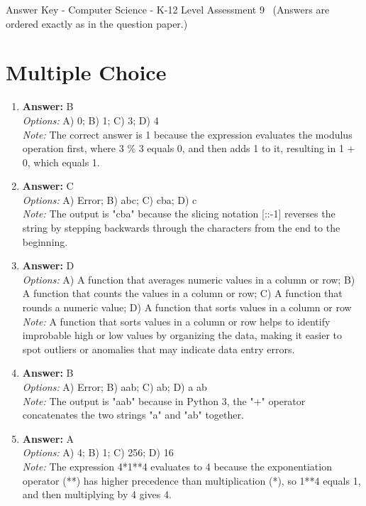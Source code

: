 \documentclass[12pt]{article}
\begin{document}
\begin{center}
Answer Key - Computer Science - K-12 Level Assessment 9 \
\small (Answers are ordered exactly as in the question paper.)
\end{center}

\section*{Multiple Choice}
\begin{enumerate}[label=\arabic*.]
\item \textbf{Answer:} B
\\ \textit{Options:} A) 0; B) 1; C) 3; D) 4
\\ \textit{Note:} The correct answer is 1 because the expression evaluates the modulus operation first, where 3 \% 3 equals 0, and then adds 1 to it, resulting in 1 + 0, which equals 1.
\item \textbf{Answer:} C
\\ \textit{Options:} A) Error; B) abc; C) cba; D) c
\\ \textit{Note:} The output is "cba" because the slicing notation [::-1] reverses the string by stepping backwards through the characters from the end to the beginning.
\item \textbf{Answer:} D
\\ \textit{Options:} A) A function that averages numeric values in a column or row; B) A function that counts the values in a column or row; C) A function that rounds a numeric value; D) A function that sorts values in a column or row
\\ \textit{Note:} A function that sorts values in a column or row helps to identify improbable high or low values by organizing the data, making it easier to spot outliers or anomalies that may indicate data entry errors.
\item \textbf{Answer:} B
\\ \textit{Options:} A) Error; B) aab; C) ab; D) a ab
\\ \textit{Note:} The output is "aab" because in Python 3, the "+" operator concatenates the two strings "a" and "ab" together.
\item \textbf{Answer:} A
\\ \textit{Options:} A) 4; B) 1; C) 256; D) 16
\\ \textit{Note:} The expression 4*1**4 evaluates to 4 because the exponentiation operator (**) has higher precedence than multiplication (*), so 1**4 equals 1, and then multiplying by 4 gives 4.
\end{enumerate}
\end{document}
